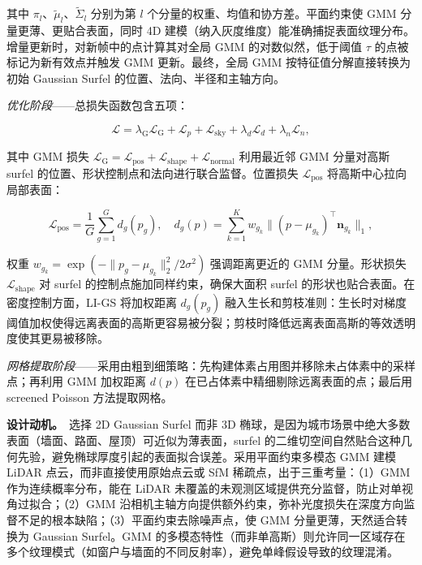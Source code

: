 其中 $\pi_l$、$\tilde{\mu}_l$、$\tilde{\Sigma}_l$ 分别为第 $l$ 个分量的权重、均值和协方差。平面约束使 GMM 分量更薄、更贴合表面，同时 4D 建模（纳入灰度维度）能准确捕捉表面纹理分布。增量更新时，对新帧中的点计算其对全局 GMM 的对数似然，低于阈值 $\tau$ 的点被标记为新有效点并触发 GMM 更新。最终，全局 GMM 按特征值分解直接转换为初始 Gaussian Surfel 的位置、法向、半径和主轴方向。

\emph{优化阶段}——总损失函数包含五项：

\begin{equation}
    \mathcal{L} = \lambda_\text{G} \mathcal{L}_\text{G} + \mathcal{L}_p + \mathcal{L}_\text{sky} + \lambda_d \mathcal{L}_d + \lambda_n \mathcal{L}_n,
\end{equation}

其中 GMM 损失 $\mathcal{L}_\text{G} = \mathcal{L}_\text{pos} + \mathcal{L}_\text{shape} + \mathcal{L}_\text{normal}$ 利用最近邻 GMM 分量对高斯 surfel 的位置、形状控制点和法向进行联合监督。位置损失 $\mathcal{L}_\text{pos}$ 将高斯中心拉向局部表面：

\begin{equation}
    \mathcal{L}_\text{pos} = \frac{1}{G} \sum_{g=1}^{G} d_g(p_g), \quad d_g(p) = \sum_{k=1}^{K} w_{g_k} \| (p - \mu_{g_k})^\top \mathbf{n}_{g_k} \|_1,
\end{equation}

权重 $w_{g_k} = \exp(-\|p_g - \mu_{g_k}\|_2^2 / 2\sigma^2)$ 强调距离更近的 GMM 分量。形状损失 $\mathcal{L}_\text{shape}$ 对 surfel 的控制点施加同样约束，确保大面积 surfel 的形状也贴合表面。在密度控制方面，LI-GS 将加权距离 $d_g(p_g)$ 融入生长和剪枝准则：生长时对梯度阈值加权使得远离表面的高斯更容易被分裂；剪枝时降低远离表面高斯的等效透明度使其更易被移除。

\emph{网格提取阶段}——采用由粗到细策略：先构建体素占用图并移除未占体素中的采样点；再利用 GMM 加权距离 $d(p)$ 在已占体素中精细剔除远离表面的点；最后用 screened Poisson 方法提取网格。

\textbf{设计动机。}~选择 2D Gaussian Surfel 而非 3D 椭球，是因为城市场景中绝大多数表面（墙面、路面、屋顶）可近似为薄表面，surfel 的二维切空间自然贴合这种几何先验，避免椭球厚度引起的表面拟合误差。采用平面约束多模态 GMM 建模 LiDAR 点云，而非直接使用原始点云或 SfM 稀疏点，出于三重考量：（1）GMM 作为连续概率分布，能在 LiDAR 未覆盖的未观测区域提供充分监督，防止对单视角过拟合；（2）GMM 沿相机主轴方向提供额外约束，弥补光度损失在深度方向监督不足的根本缺陷；（3）平面约束去除噪声点，使 GMM 分量更薄，天然适合转换为 Gaussian Surfel。GMM 的多模态特性（而非单高斯）则允许同一区域存在多个纹理模式（如窗户与墙面的不同反射率），避免单峰假设导致的纹理混淆。

